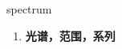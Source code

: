 
\begin{frame}
{\huge spectrum}
\begin{center}
\begin{enumerate}\Large
  \item \textbf{光谱，范围，系列}
\end{enumerate}
\end{center}
\end{frame}
